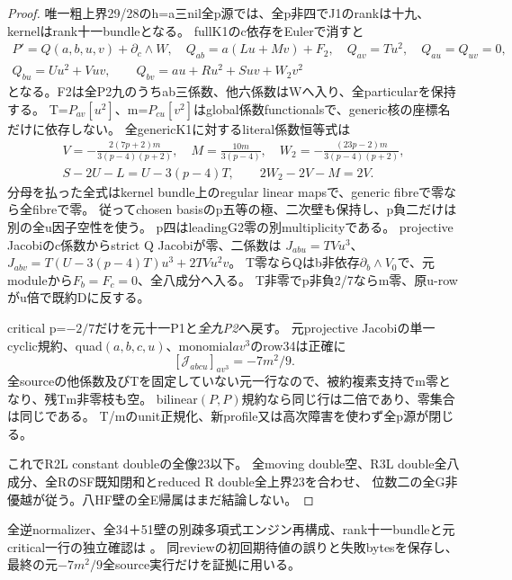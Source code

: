 \documentclass[a4paper,11pt]{ltjsarticle}
\theoremstyle{definition}
\begin{document}
\begin{proof}
唯一粗上界29/28のh=a三nil全p源では、全p非四でJ1のrankは十九、kernelはrank十一bundleとなる。
fullK1のc依存をEulerで消すと
\[
\begin{gathered}
 P'=Q(a,b,u,v)+\partial_c\wedge W,\quad
 Q_{ab}=a(Lu+Mv)+F_2,\quad Q_{av}=Tu^2,\quad Q_{au}=Q_{uv}=0,\\
 Q_{bu}=Uu^2+Vuv,\qquad Q_{bv}=au+Ru^2+Suv+W_2v^2
\end{gathered}
\]
となる。F2は全P2九のうちab三係数、他六係数はWへ入り、全particularを保持する。
T=$P_{av}[u^2]$、m=$P_{cu}[v^2]$はglobal係数functionalsで、generic核の座標名だけに依存しない。
全genericK1に対するliteral係数恒等式は
\[
\begin{gathered}
 V=-\frac{2(7p+2)m}{3(p-4)(p+2)},\quad M=\frac{10m}{3(p-4)},\quad
 W_2=-\frac{(23p-2)m}{3(p-4)(p+2)},\\
 S-2U-L=U-3(p-4)T,\qquad 2W_2-2V-M=2V.
\end{gathered}
\]
分母を払った全式はkernel bundle上のregular linear mapsで、generic fibreで零なら全fibreで零。
従ってchosen basisのp五等の極、二次壁も保持し、p負二だけは別の全u因子空性を使う。
p四はleadingG2零の別multiplicityである。
projective Jacobiのc係数からstrict Q Jacobiが零、二係数は
$J_{abu}=TVu^3$、$J_{abv}=T(U-3(p-4)T)u^3+2TVu^2v$。
T零ならQはb非依存$\partial_b\wedge V_0$で、元moduleから$F_b=F_c=0$、全八成分へ入る。
T非零でp非負2/7ならm零、原u-rowがu倍で既約Dに反する。

critical p=$-2/7$だけを元十一P1と\emph{全九P2}へ戻す。
元projective Jacobiの単一cyclic規約、quad$(a,b,c,u)$、monomial$av^3$のrow34は正確に
\[
 [\mathcal J_{abcu}]_{av^3}=-7m^2/9.
\]
全sourceの他係数及びTを固定していない元一行なので、被約複素支持でm零となり、残Tm非零枝も空。
bilinear$(P,P)$規約なら同じ行は二倍であり、零集合は同じである。
T/mのunit正規化、新profile又は高次障害を使わず全p源が閉じる。

これでR2L constant doubleの全像23以下。
全moving double空、R3L double全八成分、全RのSF既知閉和とreduced R double全上界23を合わせ、
位数二の全G非優越が従う。八HF壁の全E帰属はまだ結論しない。
\end{proof}
全逆normalizer、全34＋51壁の別疎多項式エンジン再構成、rank十一bundleと元critical一行の独立確認は
。
同reviewの初回期待値の誤りと失敗bytesを保存し、最終の元$-7m^2/9$全source実行だけを証拠に用いる。
\end{document}
